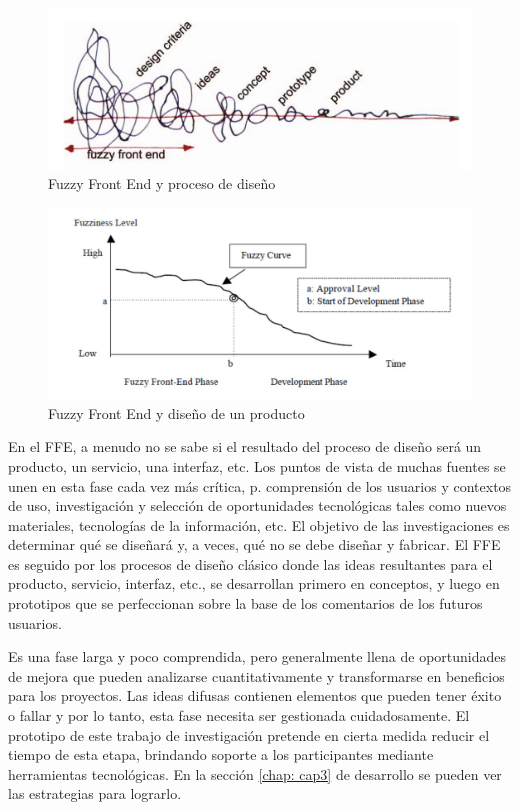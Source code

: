 \begin{figure}
\centering
\includegraphics[width=12cm]{Img/CPD/cpd-fuzzy.jpg}
\caption[(optional short caption)]{\label{fig:fuzzy} Fuzzy Front End y proceso de diseño}
\end{figure}

\begin{figure}
\centering
\includegraphics[width=12cm]{Img/CPD/cpd-fuzzi2.jpg}
\caption[(optional short caption)]{\label{fig:fuzzy} Fuzzy Front End y diseño de un producto}
\end{figure}

En el FFE, a menudo no se sabe si el resultado del proceso de diseño será un producto, un servicio, una interfaz, etc. Los puntos de vista de muchas fuentes se unen en esta fase cada vez más crítica, p. comprensión de los usuarios y contextos de uso, investigación y selección de oportunidades tecnológicas tales como nuevos materiales, tecnologías de la información, etc. El objetivo de las investigaciones es determinar qué se diseñará y, a veces, qué no se debe diseñar y fabricar. El FFE es seguido por los procesos de diseño clásico donde las ideas resultantes para el producto, servicio, interfaz, etc., se desarrollan primero en conceptos, y luego en prototipos que se perfeccionan sobre la base de los comentarios de los futuros usuarios.

Es una fase larga y poco comprendida, pero generalmente llena de oportunidades de mejora que pueden analizarse cuantitativamente y transformarse en beneficios para los proyectos. Las ideas difusas contienen elementos que pueden tener éxito o fallar y por lo tanto, esta fase necesita ser gestionada cuidadosamente. El prototipo de este trabajo de investigación pretende en cierta medida reducir el tiempo de esta etapa, brindando soporte a los participantes mediante herramientas tecnológicas. En la sección \ref{chap: cap3} de desarrollo se pueden ver las estrategias para lograrlo.



